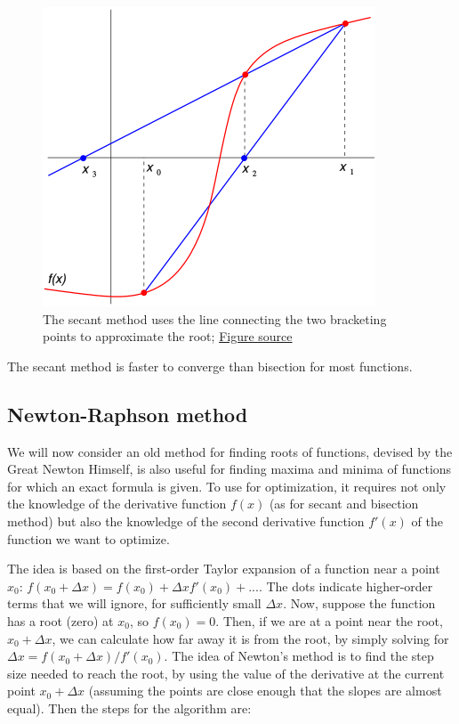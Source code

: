 \documentclass[
  letterpaper,
  DIV=11,
  numbers=noendperiod]{scrreprt}
\begin{document}
\begin{figure}[H]

{\centering \includegraphics{figs/Secant_method.png}

}

\caption{The secant method uses the line connecting the two bracketing
points to approximate the root;
\href{https://commons.wikimedia.org/w/index.php?curid=877497}{Figure
source}}

\end{figure}%

The secant method is faster to converge than bisection for most
functions.

\subsection{Newton-Raphson method}\label{newton-raphson-method}

We will now consider an old method for finding roots of functions,
devised by the Great Newton Himself, is also useful for finding maxima
and minima of functions for which an exact formula is given. To use for
optimization, it requires not only the knowledge of the derivative
function \(f(x)\) (as for secant and bisection method) but also the
knowledge of the second derivative function \(f'(x)\) of the function we
want to optimize.

The idea is based on the first-order Taylor expansion of a function near
a point \(x_0\):
\(f(x_0 + \Delta x) = f(x_0) + \Delta x f'(x_0) + ...\). The dots
indicate higher-order terms that we will ignore, for sufficiently small
\(\Delta x\). Now, suppose the function has a root (zero) at \(x_0\), so
\(f(x_0) = 0\). Then, if we are at a point near the root,
\(x_0 + \Delta x\), we can calculate how far away it is from the root,
by simply solving for \(\Delta x = f(x_0 + \Delta x) / f'(x_0)\). The
idea of Newton's method is to find the step size needed to reach the
root, by using the value of the derivative at the current point
\(x_0 + \Delta x\) (assuming the points are close enough that the slopes
are almost equal). Then the steps for the algorithm are:
\end{document}
